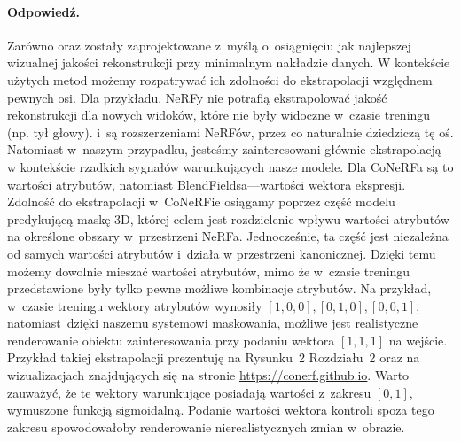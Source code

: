 \documentclass{rebuttal}
\begin{document}
\paragraph{Odpowiedź.}
  Zarówno \conerf oraz \blendfields zostały zaprojektowane z~myślą o~osiągnięciu
  jak najlepszej wizualnej jakości rekonstrukcji przy minimalnym nakładzie
  danych. W kontekście użytych metod możemy rozpatrywać ich zdolności do
  ekstrapolacji względnem pewnych osi. Dla przykładu, NeRFy nie potrafią
  ekstrapolować jakość rekonstrukcji dla nowych widoków, które nie były widoczne
  w~czasie treningu (np. tył głowy). \conerf i~\blendfields są rozszerzeniami
  NeRFów, przez co naturalnie dziedziczą tę oś. Natomiast w~naszym przypadku,
  jesteśmy zainteresowani głównie ekstrapolacją w kontekście rzadkich sygnałów
  warunkujących nasze modele. Dla CoNeRFa są to wartości atrybutów, natomiast
  BlendFieldsa---wartości wektora ekspresji. Zdolność do ekstrapolacji
  w~CoNeRFie osiągamy poprzez część modelu predykującą maskę 3D, której celem
  jest rozdzielenie wpływu wartości atrybutów na określone obszary w~przestrzeni
  NeRFa. Jednocześnie, ta część jest niezależna od samych wartości atrybutów
  i~działa w przestrzeni kanonicznej. Dzięki temu możemy dowolnie mieszać
  wartości atrybutów, mimo że w~czasie treningu przedstawione były tylko pewne
  możliwe kombinacje atrybutów. Na przykład, w~czasie treningu wektory atrybutów
  wynosiły $[1, 0, 0], [0, 1, 0], [0, 0, 1]$, natomiast~dzięki naszemu systemowi
  maskowania, możliwe jest realistyczne renderowanie obiektu zainteresowania
  przy podaniu wektora $[1, 1, 1]$ na wejście. Przykład takiej ekstrapolacji
  prezentuję na Rysunku~2 Rozdziału~2 oraz na wizualizacjach znajdujących się na
  stronie \url{https://conerf.github.io}. Warto zauważyć, że te wektory
  warunkujące posiadają wartości z~zakresu $[0, 1]$, wymuszone funkcją
  sigmoidalną. Podanie wartości wektora kontroli spoza tego zakresu
  spowodowałoby renderowanie nierealistycznych zmian w~obrazie.
\end{document}
